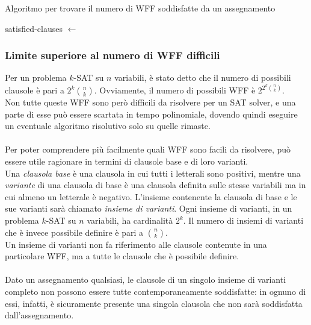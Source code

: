 \begin{algorithm}
    \caption{Algoritmo per trovare il numero di WFF soddisfatte da un assegnamento}
    \label{alg:count_sat_wffs}
    \begin{algorithmic}
            \State satisfied-clauses $\gets$ 
            \State \Return {}
        \EndProcedure
    \end{algorithmic}
\end{algorithm}


\subsubsection{Limite superiore al numero di WFF difficili}
Per un problema $k$-SAT su $n$ variabili, è stato detto che il numero di possibili clausole è pari
a $2^k \binom{n}{k}$.
Ovviamente, il numero di possibili WFF è $2^{2^k \binom{n}{k}}$.\\
Non tutte queste WFF sono però difficili da risolvere per un SAT solver, e una parte di esse può essere scartata in tempo polinomiale, dovendo quindi eseguire un eventuale algoritmo risolutivo solo su quelle rimaste.\\
\\
Per poter comprendere più facilmente quali WFF sono facili da risolvere, può essere utile ragionare in termini di clausole base e di loro varianti.\\
Una \textit{clausola base} è una clausola in cui tutti i letterali sono positivi,
mentre una \textit{variante} di una clausola di base è una clausola definita sulle stesse 
variabili ma in cui almeno un letterale è negativo. 
L'insieme contenente la clausola di base e le sue varianti sarà chiamato
\textit{insieme di varianti}. Ogni insieme di varianti, in un problema $k$-SAT su $n$ variabili, ha cardinalità $2^k$. Il numero di insiemi di varianti che è invece possibile definire è pari a $\binom{n}{k}$.\\
Un insieme di varianti non fa riferimento alle clausole contenute in una particolare WFF, ma a tutte le clausole che è possibile definire.\\
\\
Dato un assegnamento qualsiasi, le clausole di un singolo insieme di varianti completo non possono essere tutte contemporaneamente soddisfatte: in ognuno di essi, infatti, è sicuramente presente una singola clausola che non sarà soddisfatta dall'assegnamento.\\
